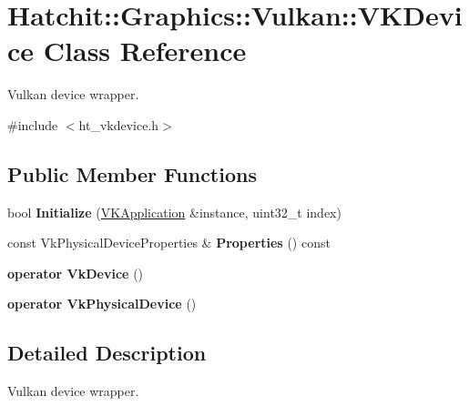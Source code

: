 \hypertarget{classHatchit_1_1Graphics_1_1Vulkan_1_1VKDevice}{}\section{Hatchit\+:\+:Graphics\+:\+:Vulkan\+:\+:V\+K\+Device Class Reference}
\label{classHatchit_1_1Graphics_1_1Vulkan_1_1VKDevice}


Vulkan device wrapper.  




{\ttfamily \#include $<$ht\+\_\+vkdevice.\+h$>$}

\subsection*{Public Member Functions}
\begin{DoxyCompactItemize}
\item 
bool {\bfseries Initialize} (\hyperlink{classHatchit_1_1Graphics_1_1Vulkan_1_1VKApplication}{V\+K\+Application} \&instance, uint32\+\_\+t index)\hypertarget{classHatchit_1_1Graphics_1_1Vulkan_1_1VKDevice_ad151aced3317dd1cf09c5da55a6e31ef}{}\label{classHatchit_1_1Graphics_1_1Vulkan_1_1VKDevice_ad151aced3317dd1cf09c5da55a6e31ef}

\item 
const Vk\+Physical\+Device\+Properties \& {\bfseries Properties} () const \hypertarget{classHatchit_1_1Graphics_1_1Vulkan_1_1VKDevice_a71da40e124745369fe006fadcfd97a35}{}\label{classHatchit_1_1Graphics_1_1Vulkan_1_1VKDevice_a71da40e124745369fe006fadcfd97a35}

\item 
{\bfseries operator Vk\+Device} ()\hypertarget{classHatchit_1_1Graphics_1_1Vulkan_1_1VKDevice_ad28a9a246194a8941cd2e0bd688ba77c}{}\label{classHatchit_1_1Graphics_1_1Vulkan_1_1VKDevice_ad28a9a246194a8941cd2e0bd688ba77c}

\item 
{\bfseries operator Vk\+Physical\+Device} ()\hypertarget{classHatchit_1_1Graphics_1_1Vulkan_1_1VKDevice_a07d8bfb07f4a45138b00b312cb175959}{}\label{classHatchit_1_1Graphics_1_1Vulkan_1_1VKDevice_a07d8bfb07f4a45138b00b312cb175959}

\end{DoxyCompactItemize}


\subsection{Detailed Description}
Vulkan device wrapper. 

